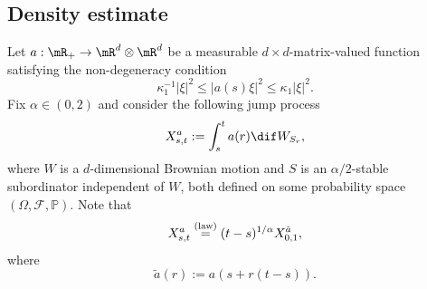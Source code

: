 \subsection{Density estimate }
\label{SEC_DENS_EST}
Let $a:\mR_+\to\mR^d\otimes\mR^d$ be a measurable $d\times d$-matrix-valued function satisfying
the non-degeneracy condition
\begin{equation}\label{AA4}
\kappa_1^{-1}|\xi|^2\leq |a(s)\xi|^2\leq \kappa_1|\xi|^2.
\end{equation}
Fix $\alpha\in (0,2)$ and consider the following jump process
\begin{equation}\label{SUB_INTEGRAL}
X^a_{s,t}:=\int^t_sa(r)\dif W_{S_r},
\end{equation}
where $ W$ is a $d$-dimensional Brownian motion and $S$ is an $\alpha/2$-stable subordinator independent of $W$, both defined on some probability space $(\Omega,\mathcal F,\mathbb P) $. Note that
\[
X^a_{s,t}\stackrel{\textup{(law)}}{=}(t-s)^{1/\alpha}X^{\tilde a}_{0,1},
\]
where
\[
\tilde a(r):=a(s+r(t-s)).
\]

